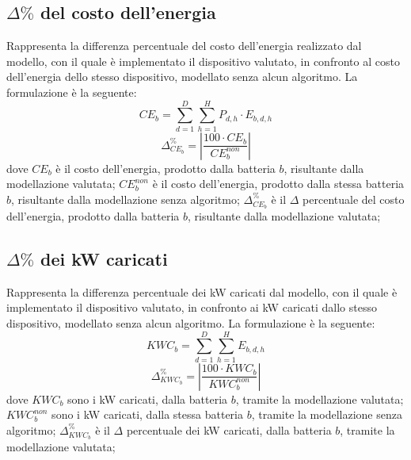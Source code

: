 \documentclass[italian, Lau, oneside]{sapthesis}
\begin{document}
\subsection{$\Delta \%$ del costo dell'energia}
Rappresenta la differenza percentuale del costo dell'energia realizzato dal modello, con il quale è implementato il dispositivo valutato, in confronto al costo dell’energia dello stesso dispositivo, modellato senza alcun algoritmo. La formulazione è la seguente:
\begin{equation}
    CE_b = \sum^{D}_{d = 1}\sum^{H}_{h = 1} P_{d,h} \cdot E_{b, d,h}
\end{equation}
\begin{equation}
    \Delta ^\%_{CE_b} = \left| \frac{100 \cdot CE_b}{CE^{non}_b} \right|
\end{equation}
dove $CE_b$ è il costo dell'energia, prodotto dalla batteria $b$, risultante dalla modellazione valutata; $CE^{non}_b$ è il costo dell'energia, prodotto dalla stessa batteria $b$, risultante dalla modellazione senza algoritmo; $\Delta ^\%_{CE_b}$ è il $\Delta $ percentuale del costo dell'energia, prodotto dalla batteria $b$, risultante dalla modellazione valutata;

\subsection{$\Delta \%$ dei kW caricati}
Rappresenta la differenza percentuale dei kW caricati dal modello, con il quale è implementato il dispositivo valutato, in confronto ai kW caricati dallo stesso dispositivo, modellato senza alcun algoritmo. La formulazione è la seguente:
\begin{equation}
    KWC_b = \sum^{D}_{d = 1}\sum^{H}_{h = 1} E_{b, d,h}
\end{equation}
\begin{equation}
    \Delta ^\%_{KWC_b} = \left| \frac{100 \cdot KWC_b}{KWC^{non}_b} \right|
\end{equation}
dove $KWC_b$ sono i kW caricati, dalla batteria $b$, tramite la modellazione valutata; $KWC^{non}_b$ sono i kW caricati, dalla stessa batteria $b$, tramite la modellazione senza algoritmo; $\Delta ^\%_{KWC_b}$ è il $\Delta $ percentuale dei kW caricati, dalla batteria $b$, tramite la modellazione valutata;
    
\end{document}
